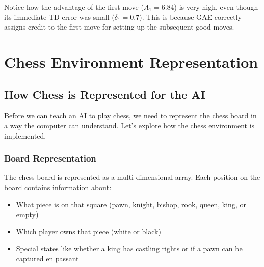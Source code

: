 \documentclass[11pt]{article}
\begin{document}
Notice how the advantage of the first move ($A_1 = 6.84$) is very high, even though its immediate TD error was small ($\delta_1 = 0.7$). This is because GAE correctly assigns credit to the first move for setting up the subsequent good moves.

\section{Chess Environment Representation}

\subsection{How Chess is Represented for the AI}

Before we can teach an AI to play chess, we need to represent the chess board in a way the computer can understand. Let's explore how the chess environment is implemented.

\subsubsection{Board Representation}

The chess board is represented as a multi-dimensional array. Each position on the board contains information about:

\begin{itemize}
    \item What piece is on that square (pawn, knight, bishop, rook, queen, king, or empty)
    \item Which player owns that piece (white or black)
    \item Special states like whether a king has castling rights or if a pawn can be captured en passant
\end{itemize}
\end{document}
